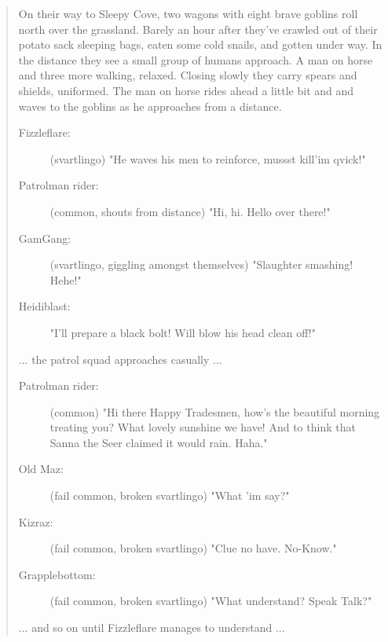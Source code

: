 \begin{quote}
\begin{small}

On their way to Sleepy Cove, two wagons with eight brave goblins roll north over the grassland. Barely an hour after they've crawled out of their potato sack sleeping bags, eaten some cold snails, and gotten under way. In the distance they see a small group of humans approach. A man on horse and three more walking, relaxed. Closing slowly they carry spears and shields, uniformed. The man on horse rides ahead a little bit and and waves to the goblins as he approaches from a distance.

\begin{description}

\item[Fizzleflare:] \vsmall (svartlingo) \small
"He waves his men to reinforce, mussst kill'im qvick!"

\item[Patrolman rider:] \vsmall (common, shouts from distance) \small 
"Hi, hi. Hello over there!"

\item[GamGang:] \vsmall (svartlingo, giggling amongst themselves) \small 
"Slaughter smashing! Hehe!"

\item[Heidiblast:]
"I'll prepare a black bolt! Will blow his head clean off!"

\end{description}
... the patrol squad approaches casually ...
\begin{description}

\item[Patrolman rider:] \vsmall (common) \small
"Hi there Happy Tradesmen, how's the beautiful morning treating you? What lovely sunshine we have! And to think that Sanna the Seer claimed it would rain. Haha."

\item[Old Maz:] \vsmall (fail common, broken svartlingo) \small
"What 'im say?"

\item[Kizraz:] \vsmall (fail common, broken svartlingo) \small
"Clue no have. No-Know."

\item[Grapplebottom:] \vsmall (fail common, broken svartlingo) \small
"What understand? Speak Talk?"

\end{description}
... and so on until Fizzleflare manages to understand ...
\begin{description}


\end{description}
\end{small}
\end{quote}
